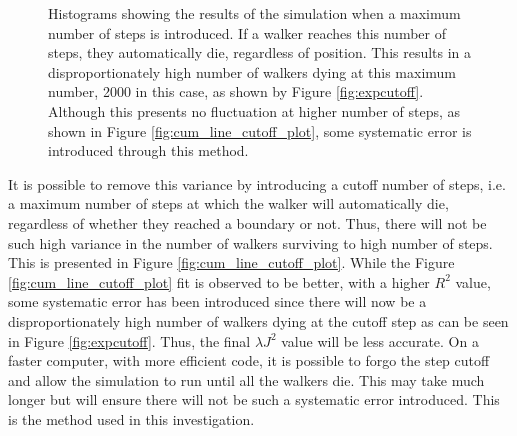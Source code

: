 \documentclass[journal]{IEEEtran}
\begin{document}
\begin{figure}[ht!]
  \centering
  \centering
  \caption{Histograms showing the results of the simulation when a maximum number
  of steps is introduced. If a walker reaches this number of steps, they
  automatically die, regardless of position. This results in a
  disproportionately high number of walkers dying at this maximum number, 2000
  in this case, as shown by Figure \ref{fig:expcutoff}. Although this presents
  no fluctuation at higher number of steps, as shown in Figure
  \ref{fig:cum_line_cutoff_plot}, some systematic error is introduced
  through this method.}
  \label{fig:cutoffplots}
\end{figure}

It is possible to remove this variance by introducing a cutoff number of steps,
i.e. a maximum number of steps at which the walker will automatically die,
regardless of whether they reached a boundary or not. Thus, there will not be
such high variance in the number of walkers surviving to high number of
steps. This is presented in Figure \ref{fig:cum_line_cutoff_plot}. While the
Figure \ref{fig:cum_line_cutoff_plot} fit is observed to be better, with a
higher $R^2$ value, some systematic error has been introduced since there will
now be a disproportionately high number of walkers dying at the cutoff step as
can be seen in Figure \ref{fig:expcutoff}. Thus, the final $\lambda J^2$ value
will be less accurate. On a faster computer, with more efficient code, it is
possible to forgo the step cutoff and allow the simulation to run until all the
walkers die. This may take much longer but will ensure there will not be such a
systematic error introduced. This is the method used in this investigation.
\end{document}
